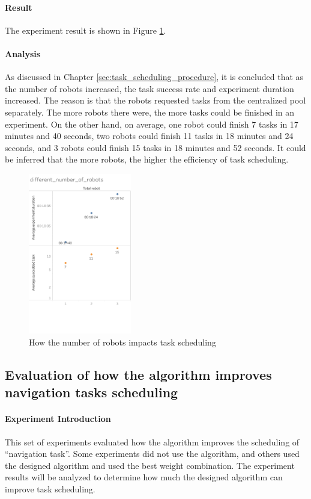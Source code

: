 \paragraph{Result} The experiment result is shown in Figure \ref{fig:different_number_of_robot}.

\paragraph{Analysis} As discussed in Chapter \ref{sec:task_scheduling_procedure}, it is concluded that as the number of robots increased, the task success rate and experiment duration increased. The reason is that the robots requested tasks from the centralized pool separately. The more robots there were, the more tasks could be finished in an experiment. 
On the other hand, on average, one robot could finish 7 tasks in 17 minutes and 40 seconds, two robots could finish 11 tasks in 18 minutes and 24 seconds, and 3 robots could finish 15 tasks in 18 minutes and 52 seconds. It could be inferred that the more robots, the higher the efficiency of task scheduling.

\begin{figure}[htbp]
 \centering
 \includegraphics[width = 0.4\textwidth]{content/images/ch5/different_number_of_robots.png}
 \caption{How the number of robots impacts task scheduling}
 \label{fig:different_number_of_robot}
\end{figure}

\subsection{Evaluation of how the algorithm improves navigation tasks scheduling}

\paragraph{Experiment Introduction} 
This set of experiments evaluated how the algorithm improves the scheduling of ``navigation task''. Some experiments did not use the algorithm, and others used the designed algorithm and used the best weight combination. The experiment results will be analyzed to determine how much the designed algorithm can improve task scheduling.


